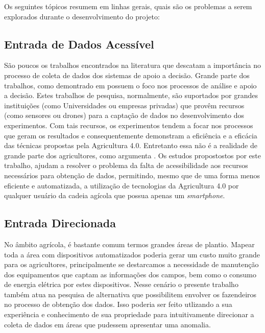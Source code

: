 \documentclass[12pt]{article}
\begin{document}
Os seguintes tópicos resumem em linhas gerais, quais são os problemas a serem explorados durante o desenvolvimento do projeto:

\subsection{Entrada de Dados Acessível}
\label{subsubsec:entrada_dados_acessivel}

São poucos os trabalhos encontrados na literatura que descatam a importância no processo de coleta de dados dos sistemas de apoio a decisão. Grande parte dos trabalhos, como demontrado em \cite{Massruha:2017} possuem o foco nos processos de análise e apoio a decisão. Estes trabalhos de pesquisa, normalmente, são suportados por grandes instituições (como Universidades ou empresas privadas) que provêm recursos (como sensores ou drones) para a captação de dados no desenvolvimento dos experimentos. Com tais recursos, os experimentos tendem a focar nos processos que geram os resultados e consequentemente demonstram a eficiência e a eficácia das técnicas propostas pela Agricultura 4.0. Entretanto essa não é a realidade de grande parte dos agricultores, como argumenta \cite{Rose:2019}. Os estudos propostostos por este trabalho, ajudam a resolver o problema da falta de acessibilidade aos recursos necessários para obtenção de dados, permitindo, mesmo que de uma forma menos eficiente e automatizada, a utilização de tecnologias da Agricultura 4.0 por qualquer usuário da cadeia agícola que possua apenas um \textit{smartphone}.

\subsection{Entrada Direcionada}
\label{subsubsec:entrada_direcionada}

No âmbito agrícola, é bastante comum termos grandes áreas de plantio. Mapear toda a área com dispositivos automatizados poderia gerar um custo muito grande para os agricultores, principalmente se destarcamos a necessidade de manutenção dos equipamentos que captam as informações dos campos, bem como o consumo de energia elétrica por estes dispositivos. Nesse cenário o presente trabalho também atua na pesquisa de alternativa que possibilitem envolver os fazendeiros no processo de obtenção dos dados. Isso poderia ser feito utlizando a sua experiência e conhecimento de sua propriedade para intuitivamente direcionar a coleta de dados em áreas que pudessem apresentar uma anomalia.
\end{document}
